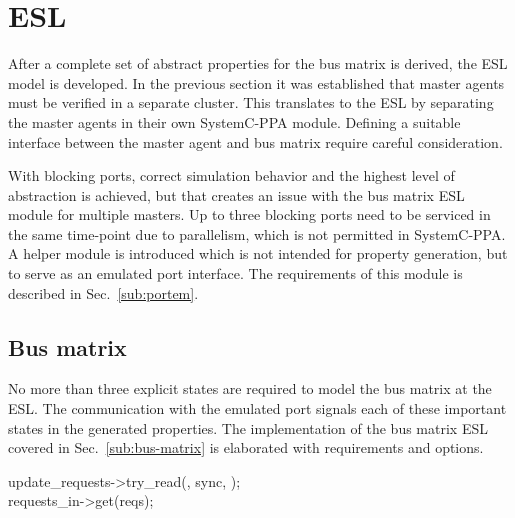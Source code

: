 \section{ESL}
After a complete set of abstract properties for the bus matrix is derived, the ESL model is developed. In the previous section it was established that master agents must be verified in a separate cluster. This translates to the ESL by separating the master agents in their own SystemC-PPA module. Defining a suitable interface between the master agent and bus matrix require careful consideration. \par
With blocking ports, correct simulation behavior and the highest level of abstraction is achieved, but that creates an issue with the bus matrix ESL module for multiple masters. Up to three blocking ports need to be serviced in the same time-point due to parallelism, which is not permitted in SystemC-PPA. A helper module is introduced which is not intended for property generation, but to serve as an emulated port interface. The requirements of this module is described in Sec.~\ref{sub:portem}.

\subsection{Bus matrix}
No more than three explicit states are required to model the bus matrix at the ESL. The communication with the emulated port signals each of these important states in the generated properties. The implementation of the bus matrix ESL covered in Sec.~\ref{sub:bus-matrix} is elaborated with requirements and options. \par
update\_requests->try\_read(, sync, );  \\
requests\_in->get(reqs); \par



